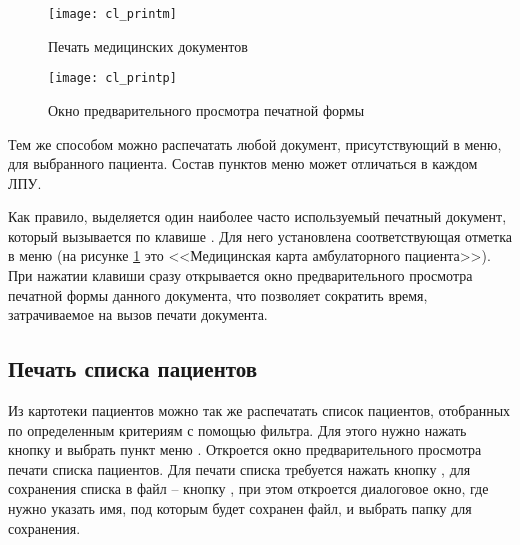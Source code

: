 \begin{figure}[ht]\centering
 \texttt{[image: cl\_printm]}
 \caption{Печать медицинских документов}
 \label{img_cl_printm}
\end{figure} 

\begin{figure}[ht]\centering
 \texttt{[image: cl\_printp]}
 \caption{Окно предварительного просмотра печатной формы}
 \label{img_cl_printing}
\end{figure} 

Тем же способом можно распечатать любой документ, присутствующий в меню, для выбранного пациента. Состав пунктов меню может отличаться в каждом ЛПУ.

Как правило, выделяется один наиболее часто используемый печатный документ, который вызывается по клавише . Для него установлена соответствующая отметка в меню (на рисунке \ref{img_cl_printm} это <<Медицинская карта амбулаторного пациента>>). При нажатии клавиши  сразу открывается окно предварительного просмотра печатной формы данного документа, что позволяет сократить время, затрачиваемое на вызов печати документа.

\subsection{Печать списка пациентов}

Из картотеки пациентов можно так же распечатать список пациентов, отобранных по определенным критериям с помощью фильтра. Для этого нужно нажать кнопку   и выбрать пункт меню . Откроется окно предварительного просмотра печати списка пациентов. Для печати списка требуется нажать кнопку , для сохранения списка в файл – кнопку  , при этом откроется диалоговое окно, где нужно указать имя, под которым будет сохранен файл, и выбрать папку для сохранения.

